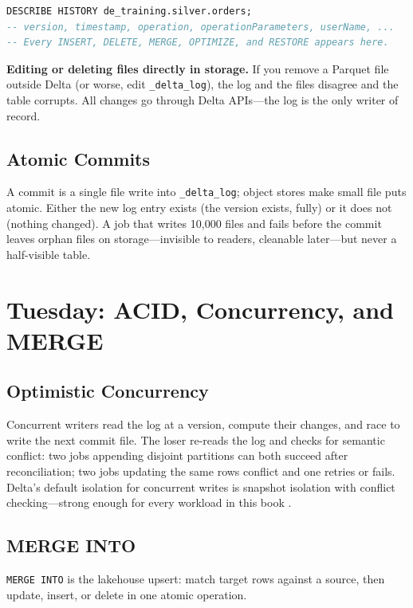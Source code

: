 \begin{lstlisting}[language=SQL,caption={Inspecting the transaction log through history.},label={lst:ch2-history}]
DESCRIBE HISTORY de_training.silver.orders;
-- version, timestamp, operation, operationParameters, userName, ...
-- Every INSERT, DELETE, MERGE, OPTIMIZE, and RESTORE appears here.
\end{lstlisting}

\begin{pitfall}
\textbf{Editing or deleting files directly in storage.} If you remove a Parquet file outside Delta (or worse, edit \texttt{\_delta\_log}), the log and the files disagree and the table corrupts. All changes go through Delta APIs---the log is the only writer of record.
\end{pitfall}

\subsection{Atomic Commits}
A commit is a single file write into \texttt{\_delta\_log}; object stores make small file puts atomic. Either the new log entry exists (the version exists, fully) or it does not (nothing changed). A job that writes 10,000 files and fails before the commit leaves orphan files on storage---invisible to readers, cleanable later---but never a half-visible table.

\section{Tuesday: ACID, Concurrency, and MERGE}
\subsection{Optimistic Concurrency}
Concurrent writers read the log at a version, compute their changes, and race to write the next commit file. The loser re-reads the log and checks for semantic conflict: two jobs appending disjoint partitions can both succeed after reconciliation; two jobs updating the same rows conflict and one retries or fails. Delta's default isolation for concurrent writes is snapshot isolation with conflict checking---strong enough for every workload in this book \cite{armbrust2020delta}.

\subsection{MERGE INTO}
\texttt{MERGE INTO} is the lakehouse upsert: match target rows against a source, then update, insert, or delete in one atomic operation.


